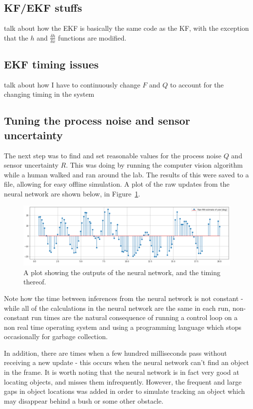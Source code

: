 \subsection{KF/EKF stuffs}
{\Large \color{red} talk about how the EKF is basically the same code as the KF, with the exception that the $h$ and $\frac{\delta h}{\delta x}$ functions are modified.}

\subsection{EKF timing issues}
{\Large \color{red} talk about how I have to continuously change $F$ and $Q$ to account for the changing timing in the system}

\subsection{Tuning the process noise and sensor uncertainty}
The next step was to find and set reasonable values for the process noise $Q$ and sensor uncertainty $R$. This was doing by running the computer vision algorithm while a human walked and ran around the lab. The results of this were saved to a file, allowing for easy offline simulation. A plot of the raw updates from the neural network are shown below, in Figure~\ref{fig:raw_nn_results}.

\begin{figure}[h!]
  \centering
  \includegraphics[width=\textwidth]{methodology/raw_nn_results}
  \caption{\label{fig:raw_nn_results} A plot showing the outputs of the neural network, and the timing thereof.}
\end{figure}

Note how the time between inferences from the neural network is not constant - while all of the calculations in the neural network are the same in each run, non-constant run times are the natural consequence of running a control loop on a non real time operating system and using a programming language which stops occasionally for garbage collection.

In addition, there are times when a few hundred milliseconds pass without receiving a new update - this occurs when the neural network can't find an object in the frame. It is worth noting that the neural network is in fact very good at locating objects, and misses them infrequently. However, the frequent and large gaps in object locations was added in order to simulate tracking an object which may disappear behind a bush or some other obstacle.

